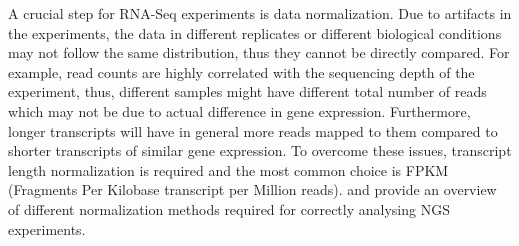 A crucial step for RNA-Seq experiments is data normalization. Due to artifacts in the experiments, the data in different replicates or different biological conditions may not follow the same distribution, thus they cannot be directly compared. For example, read counts are highly correlated with the sequencing depth of the experiment, thus, different samples might have different total number of reads which may not be due to actual difference in gene expression. Furthermore, longer transcripts will have in general more reads mapped to them compared to shorter transcripts of similar gene expression. To overcome these issues, transcript length normalization is required and the most common choice is FPKM (Fragments Per Kilobase transcript per Million reads). \citet{Robinson2010} and \citet{Aleksic2014} provide an overview of different normalization methods required for correctly analysing NGS experiments.
